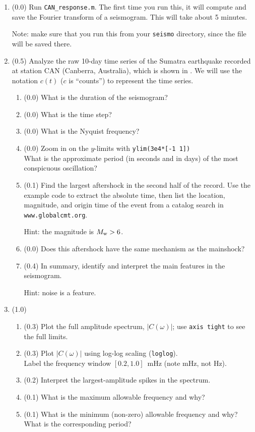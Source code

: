 \documentclass[11pt,titlepage,fleqn]{article}
\begin{document}
\begin{enumerate}

\item (0.0) Run \verb+CAN_response.m+. The first time you run this, it will compute and save the Fourier transform of a seismogram. This will take about 5 minutes.

Note: make sure that you run this from your \verb+seismo+ directory, since the file will be saved there.


\item (0.5) Analyze the raw 10-day time series of the Sumatra earthquake recorded at station CAN (Canberra, Australia), which is shown in . We will use the notation $c(t)$ ($c$ is ``counts'') to represent the time series.

\begin{enumerate}
\item (0.0) What is the duration of the seismogram?
\item (0.0) What is the time step?
\item (0.0) What is the Nyquist frequency?
\item (0.0) Zoom in on the $y$-limits with \verb+ylim(3e4*[-1 1])+ \\
What is the approximate period (in seconds and in days) of the most conspicuous oscillation?
\item (0.1) Find the largest aftershock in the second half of the record. Use the example code to extract the absolute time, then list the location, magnitude, and origin time of the event from a catalog search in \verb+www.globalcmt.org+.

Hint: the magnitude is $M_{\rm w} > 6$.

\item (0.0) Does this aftershock have the same mechanism as the mainshock?
\item (0.4) In summary, identify and interpret the main features in the seismogram.

Hint: noise is a feature.
\end{enumerate}


\item (1.0)
\begin{enumerate}
\item (0.3) Plot the full amplitude spectrum, $|C(\omega)|$; use \verb+axis tight+ to see the full limits.
\item (0.3) Plot $|C(\omega)|$ using log-log scaling (\verb+loglog+). \\
Label the frequency window $[0.2,1.0]$~mHz (note mHz, not Hz).
\item (0.2) Interpret the largest-amplitude spikes in the spectrum.
\item (0.1) What is the maximum allowable frequency and why?
\item (0.1) What is the minimum (non-zero) allowable frequency and why? \\
What is the corresponding period?
\end{enumerate}


\end{enumerate}
\end{document}
